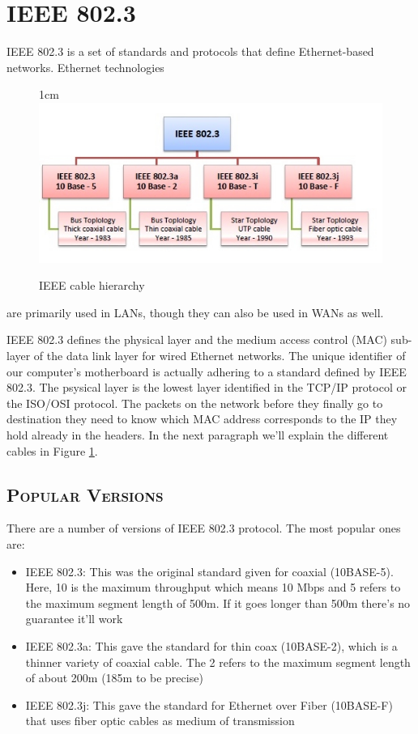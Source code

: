 \documentclass[a4paper,12pt]{book}
\begin{document}
\section{IEEE 802.3}

IEEE 802.3 is a set of standards and protocols that define Ethernet-based networks. Ethernet technologies
\begin{figure}[16]{1cm}
\centering
\includegraphics[width=13cm]{./ieee_802.jpg}
\vspace{-15pt}
\caption{IEEE cable hierarchy}\label{fig:ieee802}
\end{figure}

\noindent are primarily used in LANs, though they can also be used in WANs as well.

IEEE 802.3 defines the physical layer and the medium access control (MAC) sub-layer of the data link layer for wired Ethernet networks. The unique identifier of our computer's motherboard is actually adhering to a standard defined by IEEE 802.3.
The psysical layer is the lowest layer identified in the TCP/IP protocol or the ISO/OSI protocol. The packets on the network before they finally go to destination they need to know which MAC address corresponds to the IP they hold already in the headers. In the next paragraph we'll explain the different cables in Figure \ref{fig:ieee802}.




\subsection{\textsc{Popular Versions}}

There are a number of versions of IEEE 802.3 protocol. The most popular ones are:

\begin{itemize}
\item{IEEE 802.3: This was the original standard given for coaxial (10BASE-5). Here, 10 is the maximum throughput which means 10 Mbps and 5 refers to the maximum segment length of 500m. If it goes longer than 500m there's no guarantee it'll work}
\item{IEEE 802.3a: This gave the standard for thin coax (10BASE-2), which is a thinner variety of coaxial cable. The 2 refers to the maximum segment length of about 200m (185m to be precise)}
\item{IEEE 802.3j: This gave the standard for Ethernet over Fiber (10BASE-F) that uses fiber optic cables as medium of transmission}
\end{itemize}
\end{document}
